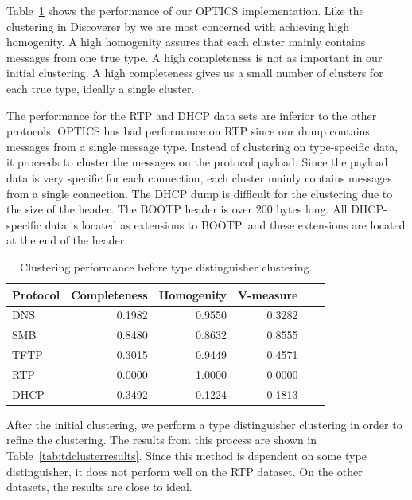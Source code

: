 \documentclass[a4paper]{report}
\begin{document}
Table~\ref{tab:initclusterresults} shows the performance of our OPTICS
implementation. Like the clustering in Discoverer by \citeauthor{cui07} we
are most concerned with achieving high homogenity. A high homogenity assures
that each cluster mainly contains messages from one true type. A high
completeness is not as important in our initial clustering. A high completeness
gives us a small number of clusters for each true type, ideally a single
cluster.

The performance for the RTP and DHCP data sets are inferior to the other
protocols. OPTICS has bad performance on RTP since our dump contains messages
from a single message type. Instead of clustering on type-specific data, it
proceeds to cluster the messages on the protocol payload. Since the payload
data is very specific for each connection, each cluster mainly contains
messages from a single connection. The DHCP dump is difficult for the
clustering due to the size of the header. The BOOTP header is over 200 bytes
long. All DHCP-specific data is located as extensions to BOOTP, and these
extensions are located at the end of the header.

\begin{table}[h]
    \centering
    \captionsetup{width=0.8\textwidth}
    \caption{Clustering performance before type distinguisher clustering.}
    \begin{tabular}{| l | r | r | r | r | r |}
        \hline
        \textbf{Protocol}&\textbf{Completeness}&\textbf{Homogenity}&\textbf{V-measure} \\ \hline
        DNS & 0.1982 & 0.9550 & 0.3282 \\ \hline
        SMB & 0.8480 & 0.8632 & 0.8555 \\ \hline
        TFTP & 0.3015 & 0.9449 & 0.4571 \\ \hline
        RTP & 0.0000 & 1.0000 & 0.0000 \\ \hline
        DHCP & 0.3492 & 0.1224 & 0.1813 \\ \hline
    \end{tabular}
    \label{tab:initclusterresults}
\end{table}

After the initial clustering, we perform a type distinguisher clustering in order
to refine the clustering. The results from this process are shown in
Table~\ref{tab:tdclusterresults}. Since this method is dependent on some
type distinguisher, it does not perform well on the RTP dataset. On the
other datasets, the results are close to ideal.
\end{document}
